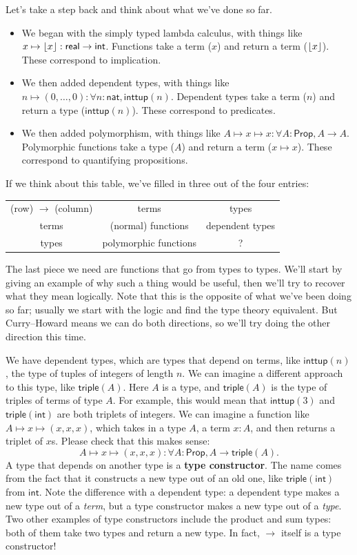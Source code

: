 \documentclass[11pt,paper=letter]{scrartcl}
\newcommand{\sf}{\mathsf}
\newcommand{\prop}{\mathsf{Prop}}
\begin{document}
Let's take a step back and think about what we've done so far.

\begin{itemize}
\item We began with the simply typed lambda calculus, with things like $x \mapsto \floor{x} : \sf{real} \to \sf{int}$. Functions take a term ($x$) and return a term ($\left\lfloor x \right\rfloor$). These correspond to implication.

\item We then added dependent types, with things like $n \mapsto (0, \ldots, 0) : \forall n: \sf{nat}, \sf{inttup}(n)$. Dependent types take a term ($n$) and return a type ($\sf{inttup}(n)$). These correspond to predicates.

\item We then added polymorphism, with things like $A \mapsto x \mapsto x : \forall A: \sf{Prop}, A \to A$. Polymorphic functions take a type ($A$) and return a term ($x \mapsto x$). These correspond to quantifying propositions.
\end{itemize}

If we think about this table, we've filled in three out of the four entries:

\begin{center}
\begin{tabular}{ccc}
(row) $\to$ (column) & terms & types \\
terms & (normal) functions & dependent types \\
types & polymorphic functions & ?
\end{tabular}
\end{center}

The last piece we need are functions that go from types to types. We'll start by giving an example of why such a thing would be useful, then we'll try to recover what they mean logically. Note that this is the opposite of what we've been doing so far; usually we start with the logic and find the type theory equivalent. But Curry--Howard means we can do both directions, so we'll try doing the other direction this time.

We have dependent types, which are types that depend on terms, like $\sf{inttup}(n)$, the type of tuples of integers of length $n$. We can imagine a different approach to this type, like $\sf{triple}(A)$. Here $A$ is a type, and $\sf{triple}(A)$ is the type of triples of terms of type $A$. For example, this would mean that $\sf{inttup}(3)$ and $\sf{triple}(\sf{int})$ are both triplets of integers. We can imagine a function like $A \mapsto x \mapsto (x, x, x)$, which takes in a type $A$, a term $x: A$, and then returns a triplet of $x$s. Please check that this makes sense: \[
  A \mapsto x \mapsto (x, x, x): \forall A: \prop, A \to \sf{triple}(A).
\]
A type that depends on another type is a \textbf{type constructor}. The name comes from the fact that it constructs a new type out of an old one, like $\sf{triple}(\sf{int})$ from $\sf{int}$. Note the difference with a dependent type: a dependent type makes a new type out of a \emph{term}, but a type constructor makes a new type out of a \emph{type}. Two other examples of type constructors include the product and sum types: both of them take two types and return a new type. In fact, $\to$ itself is a type constructor!
\end{document}
